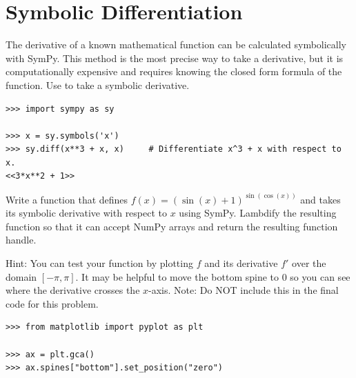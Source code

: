 \label{lab:Derivatives}

\section*{Symbolic Differentiation} %

The derivative of a known mathematical function can be calculated symbolically with SymPy.
This method is the most precise way to take a derivative, but it is computationally expensive and requires knowing the closed form formula of the function.
Use  to take a symbolic derivative.

\begin{lstlisting}
>>> import sympy as sy

>>> x = sy.symbols('x')
>>> sy.diff(x**3 + x, x)     # Differentiate x^3 + x with respect to x.
<<3*x**2 + 1>>
\end{lstlisting}

\begin{problem}
Write a function that defines $f(x) = (\sin(x) + 1)^{\sin(\cos(x))}$ and takes its symbolic derivative with respect to $x$ using SymPy.
Lambdify the resulting function so that it can accept NumPy arrays and return the resulting function handle.

\noindent Hint: You can test your function by plotting $f$ and its derivative $f'$ over the domain $[-\pi, \pi]$.
It may be helpful to move the bottom spine to $0$ so you can see where the derivative crosses the $x$-axis. Note: Do NOT include this in the final code for this problem.
\begin{lstlisting}
>>> from matplotlib import pyplot as plt

>>> ax = plt.gca()
>>> ax.spines["bottom"].set_position("zero")
\end{lstlisting}
\label{prob:sympy-symbolic-diff}
\end{problem}


